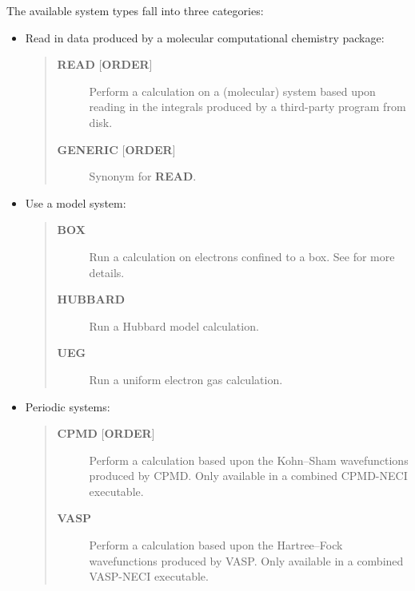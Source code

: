 \documentclass[openany,a4paper,10pt]{manual}
\begin{document}
The available system types fall into three categories:
\begin{itemize}
\item {} 
Read in data produced by a molecular computational chemistry package:
\begin{quote}
\begin{description}
\item[\textbf{READ} {[}\textbf{ORDER}{]}]
Perform a calculation on a (molecular) system based upon reading in the integrals produced
by a third-party program from disk.

\item[\textbf{GENERIC} {[}\textbf{ORDER}{]}]
Synonym for \textbf{READ}.

\end{description}
\end{quote}

\item {} 
Use a model system:
\begin{quote}
\begin{description}
\item[\textbf{BOX}]
Run a calculation on electrons confined to a box.  See \cite{TwoElBox}
for more details.

\item[\textbf{HUBBARD}]
Run a Hubbard model calculation.

\item[\textbf{UEG}]
Run a uniform electron gas calculation.

\end{description}
\end{quote}

\item {} 
Periodic systems:
\begin{quote}
\begin{description}
\item[\textbf{CPMD} {[}\textbf{ORDER}{]}]
Perform a calculation based upon the Kohn--Sham wavefunctions
produced by CPMD.  Only available in a combined CPMD-NECI
executable.

\item[\textbf{VASP}]
Perform a calculation based upon the Hartree--Fock wavefunctions
produced by VASP.  Only available in a combined VASP-NECI
executable.

\end{description}
\end{quote}

\end{itemize}
\end{document}
